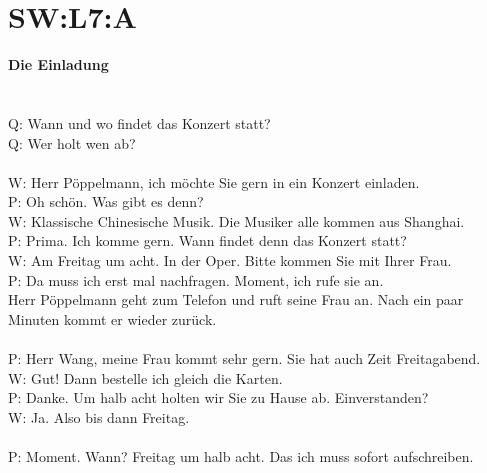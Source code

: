 \section{SW:L7:A}
\noindent
\textbf{Die Einladung} 
\\
\\
\\
Q: Wann und wo findet das Konzert statt?  \\
Q: Wer holt wen ab? \\
\\
\noindent
W: Herr Pöppelmann, ich möchte Sie gern in ein Konzert einladen. \\
P: Oh schön. Was gibt es denn?  \\
W: Klassische Chinesische Musik. Die Musiker alle kommen aus Shanghai. \\
P: Prima. Ich komme gern. Wann findet denn das Konzert statt? \\
W: Am Freitag um acht. In der Oper. Bitte kommen Sie mit Ihrer Frau.  \\
P: Da muss ich erst mal nachfragen.  Moment, ich rufe sie an.\\
\noindent
Herr Pöppelmann geht zum Telefon und ruft seine Frau an. Nach ein paar Minuten kommt er wieder zurück.  \\
\\
\noindent
P: Herr Wang, meine Frau kommt sehr gern. Sie hat auch Zeit Freitagabend. \\
W: Gut! Dann bestelle ich gleich die Karten. \\
P: Danke. Um halb acht holten wir Sie zu Hause ab. Einverstanden?  \\
W: Ja. Also bis dann Freitag.  \\
\\
\noindent
P: Moment. Wann? Freitag um halb acht. Das ich muss sofort aufschreiben.  \\

